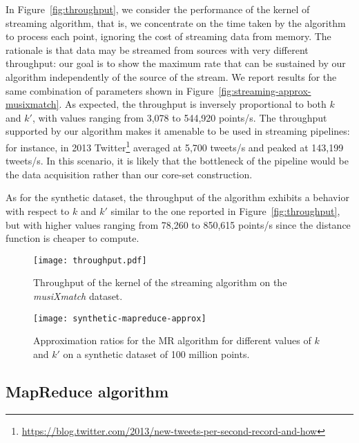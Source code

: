 \documentclass{article}
\begin{document}
In Figure~\ref{fig:throughput}, we consider the performance of the
kernel of streaming algorithm, that is, we concentrate on the time
taken by the algorithm to process each point, ignoring the cost of
streaming data from memory. The rationale is that data may be streamed
from sources with very different throughput: our goal is to show the
maximum rate that can be sustained by our algorithm independently of
the source of the stream.  We report results for the same combination
of parameters shown in Figure~\ref{fig:streaming-approx-musixmatch}.
As expected, the throughput is inversely proportional to both $k$ and
$k'$, with values ranging from 3,078 to 544,920 points/s.  The
throughput supported by our algorithm makes it amenable to be used in
streaming pipelines: for instance, in 2013
Twitter\footnote{\url{https://blog.twitter.com/2013/new-tweets-per-second-record-and-how}}
averaged at 5,700 tweets/s and peaked at 143,199 tweets/s.  In this
scenario, it is likely that the bottleneck of the pipeline would be
the data acquisition rather than our core-set construction.

As for the synthetic dataset, the throughput of the algorithm exhibits
a behavior with respect to $k$ and $k'$ similar to the one reported in
Figure~\ref{fig:throughput}, but with higher values ranging from
78,260 to 850,615 points/s since the distance function is cheaper to compute.

\begin{figure}[t]
  \begin{minipage}{.49\linewidth}
    \centering
    \texttt{[image: throughput.pdf]}
    \caption{Throughput of the kernel of the streaming algorithm on the \emph{musiXmatch} dataset.}
    \label{fig:throughput}
  \end{minipage}
  \hfill
  \begin{minipage}{.49\linewidth}
    \centering
    \texttt{[image: synthetic-mapreduce-approx]}
    \caption{Approximation ratios for the MR algorithm for different values of $k$ and $k'$ on a synthetic dataset of 100 million points.}\label{fig:mapreduce-approximation}
  \end{minipage}
\end{figure}


\subsection{MapReduce algorithm} \label{subsec:MRexp}
\end{document}
